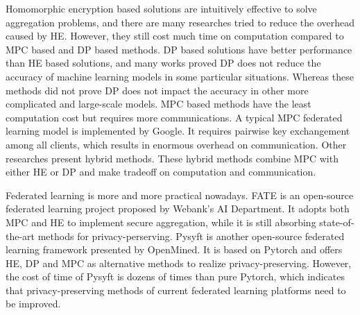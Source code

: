 Homomorphic encryption based solutions are intuitively effective to solve aggregation problems, and there are many researches tried to reduce the overhead caused by HE\cite{abs-1711-10677,BatchCrypt}. However, they still cost much time on computation compared to MPC based and DP based methods. DP based solutions have better performance than HE based solutions, and many works proved DP does not reduce the accuracy of machine learning models in some particular situations\cite{Bayesian,DPAnalysis,ZhuDP,geyer2017differentially}. Whereas these methods did not prove DP does not impact the accuracy in other more complicated and large-scale models. MPC based methods have the least computation cost but requires more communications. A typical MPC federated learning model is implemented by Google\cite{Practical}. It requires pairwise key exchangement among all clients, which results in enormous overhead on communication. Other researches present hybrid methods\cite{Hybrid,HybridAlpha}. These hybrid methods combine MPC with either HE or DP and make tradeoff on computation and communication.

Federated learning is more and more practical nowadays. FATE\cite{fate} is an open-source federated learning project proposed by Webank’s AI Department. It adopts both MPC and HE to implement secure aggregation, while it is still absorbing state-of-the-art methods for privacy-perserving. Pysyft\cite{pysyft} is another open-source federated learning framework presented by OpenMined. It is based on Pytorch and offers HE, DP and MPC as alternative methods to realize privacy-preserving. However, the cost of time of Pysyft is dozens of times than pure Pytorch, which indicates that privacy-preserving methods of current federated learning platforms need to be improved.


